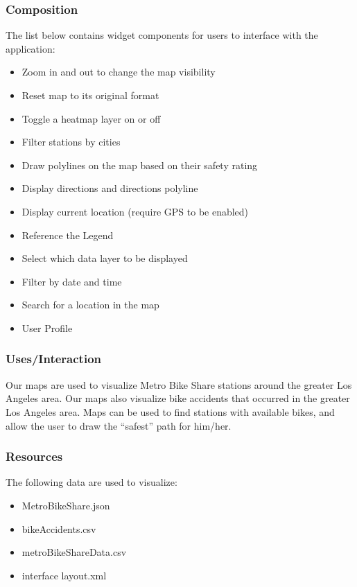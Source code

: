 \documentclass[a4paper,12pt]{article}
\begin{document}
    \subsubsection{Composition}
        The list below contains widget components for users to interface with the application:
        \begin{itemize}
            \item Zoom in and out to change the map visibility
            \item Reset map to its original format
            \item Toggle a heatmap layer on or off
            \item Filter stations by cities
            \item Draw polylines on the map based on their safety rating
            \item Display directions and directions polyline
            \item Display current location (require GPS to be enabled)
            \item Reference the Legend
            \item Select which data layer to be displayed
            \item Filter by date and time
            \item Search for a location in the map
            \item User Profile
        \end{itemize}
    \subsubsection{Uses/Interaction}
        Our maps are used to visualize Metro Bike Share stations around the greater Los Angeles area. Our maps also visualize bike accidents that occurred in the greater Los Angeles area. Maps can be used to find stations with available bikes, and allow the user to draw the “safest” path for him/her.
    \subsubsection{Resources}
        The following data are used to visualize:
        \begin{itemize}
            \item MetroBikeShare.json
            \item bikeAccidents.csv
            \item metroBikeShareData.csv
            \item interface layout.xml
        \end{itemize}
\end{document}
